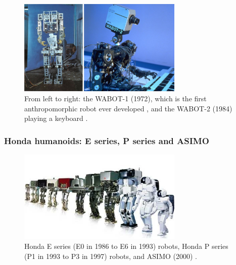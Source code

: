 \begin{figure}
    \centering
    \includegraphics[width=0.7\textwidth]{figures/01-introduction/WABOTs.jpg}
    \caption{From left to right: the WABOT-1 (1972), which is the first anthropomorphic robot
        ever developed \cite{Kato1973TheWABOT1}, and the WABOT-2 (1984)
        playing a keyboard \cite{Kato1987WABOT2}.}
    \label{fig:introduction:WABOTs}
\end{figure}

\subsubsection{Honda humanoids: E series, P series and ASIMO}
\begin{figure}
    \centering
    \includegraphics[width=0.7\textwidth]{figures/01-introduction/The-ASIMO-humanoid-robot-history.png}
    \caption{Honda E series (E0 in 1986 to E6 in 1993) robots, Honda P series (P1 in
        1993 to P3 in 1997) robots, and ASIMO (2000)
        \cite{Shigemi2019ASIMOandHumanoidRobotResearchatHonda}.}
    \label{fig:introduction:ASIMO-humanoid-history}
\end{figure}


